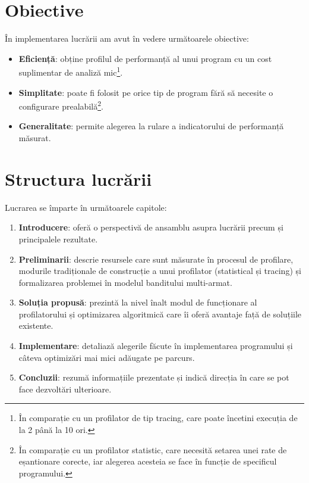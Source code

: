 \section{Obiective}

În implementarea lucrării am avut în vedere următoarele obiective:

\begin{itemize}
    \item \textbf{Eficiență}: obține profilul de performanță al unui program cu un cost suplimentar de analiză mic\footnote{În comparație cu un profilator de tip tracing, care poate încetini execuția de la 2 până la 10 ori.}.
    \item \textbf{Simplitate}: poate fi folosit pe orice tip de program fără să necesite o configurare prealabilă\footnote{În comparație cu un profilator statistic, care necesită setarea unei rate de eșantionare corecte, iar alegerea acesteia se face în funcție de specificul programului.}.
    \item \textbf{Generalitate}: permite alegerea la rulare a indicatorului de performanță măsurat.
\end{itemize}

\section{Structura lucrării}

Lucrarea se împarte în următoarele capitole:

\begin{enumerate}
    \item \textbf{Introducere}: oferă o perspectivă de ansamblu asupra lucrării precum și principalele rezultate.
    \item \textbf{Preliminarii}: descrie resursele care sunt măsurate în procesul de profilare, modurile tradiționale de construcție a unui profilator (statistical și tracing) și formalizarea problemei în modelul banditului multi-armat.
    \item \textbf{Soluția propusă}: prezintă la nivel înalt modul de funcționare al profilatorului și optimizarea algoritmică care îi oferă avantaje față de soluțiile existente.
    \item \textbf{Implementare}: detaliază alegerile făcute în implementarea programului și câteva optimizări mai mici adăugate pe parcurs.
    \item \textbf{Concluzii}: rezumă informațiile prezentate și indică direcția în care se pot face dezvoltări ulterioare.
\end{enumerate}

